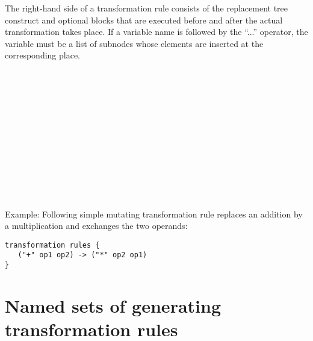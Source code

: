 \noindent
The right-hand side of a transformation rule consists of the replacement
tree construct and optional blocks that are executed before and after
the actual transformation takes place.  If a variable name is followed
by the ``...'' operator, the variable must be a list of subnodes whose
elements are inserted at the corresponding place.

\begin{grammar}
      \produces {} \nextline
	  \nextline
	  \\
      \produces {} \\
      \produces {}  \\
      \produces {} \\
      \produces \lextoken{\{}  \lextoken{\}} \\
      \produces \lextoken{(} 
	 \lextoken{)} \\
      \produces \lextoken{(} 
	  \lextoken{)} \\
      \produces {} \\
      \produces {}
	  \\
      \produces {} \\
      \produces {} \\
\end{grammar}

\noindent
Example: Following simple mutating transformation rule replaces
an addition by a multiplication and exchanges the two operands:

\begin{lstlisting}
transformation rules {
   ("+" op1 op2) -> ("*" op2 op1)
}
\end{lstlisting}

\section{Named sets of generating transformation rules}\label{named-trrules}

